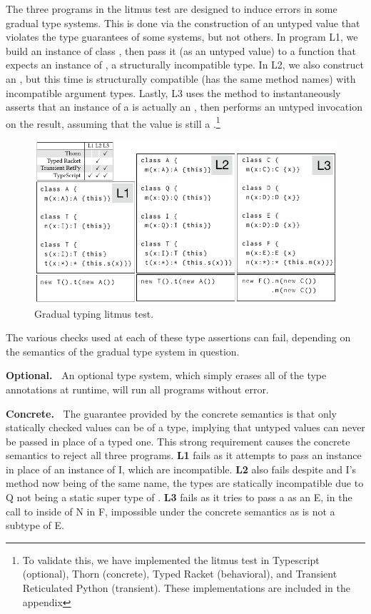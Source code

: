 \documentclass[a4paper,USenglish]{tex/lipics-v2016}
\begin{document}
The three programs in the litmus test are designed to induce errors in some
gradual type systems. This is done via the construction of an untyped value
that violates the type guarantees of some systems, but not others. In program
L1, we build an instance of class , then pass it (as an untyped value)
to a function that expects an instance of , a structurally incompatible
type. In L2, we also construct an , but this time  is structurally
compatible (has the same method names) with incompatible argument types.
Lastly, L3 uses the method \m to instantaneously asserts that an instance of a
\C is actually an , then performs an untyped invocation on the result,
assuming that the value is still a \C.\footnote{To validate this, we have
implemented the litmus test in Typescript (optional), Thorn (concrete),  Typed
Racket (behavioral), and Transient Reticulated Python (transient).  These
implementations are included in the appendix}

\begin{figure}[!h]
  \includegraphics[width=.95\columnwidth]{../figures/litm}
  \caption{Gradual typing litmus test.}\label{litmus}
\end{figure}

The various checks used at each of these type assertions can fail, depending
on the semantics of the gradual type system in question.

{\bf Optional.~} An optional type system, which simply erases all of the
type annotations at runtime, will run all programs without error.

{\bf Concrete.~} The guarantee provided by the concrete semantics is that
only statically checked values can be of a type, implying that untyped
values can never be passed in place of a typed one. This strong requirement
causes the concrete semantics to reject all three programs. {\bf L1} fails
as it attempts to pass an \A instance in place of an instance of \xt I,
which are incompatible.  {\bf L2} also fails despite \A and \xt I's
method now being of the same name, the types are statically incompatible due
to \xt Q not being a static super type of \A. {\bf L3} fails as it tries to
pass a \C as an \xt E, in the call to \m inside of \xt N in \xt F,
impossible under the concrete semantics as \C is not a subtype of \xt E.
\end{document}

